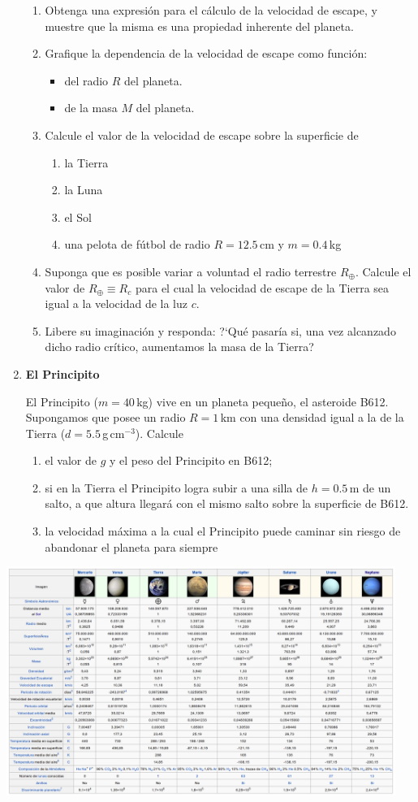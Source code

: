 \documentclass[a4paper,12pt]{article}
\begin{document}
\begin{enumerate}
\begin{enumerate}
\item Obtenga una expresión para el cálculo de la velocidad de escape, y
muestre que la misma es una propiedad inherente del planeta.
\item Grafique la dependencia de la velocidad de escape como función:
\begin{itemize}
\item del radio $R$ del planeta.
\item de la masa $M$ del planeta.
\end{itemize}
\item Calcule el valor de la velocidad de escape sobre la superficie de 
\begin{enumerate}
\item la Tierra
\item la Luna
\item el Sol 
\item una pelota de fútbol de radio $R=12.5$\,cm y $m=0.4$\,kg 
\end{enumerate}
\item Suponga que es posible variar a voluntad el radio terrestre $R_\oplus$.
Calcule el valor de $R_\oplus \equiv R_c$ para el cual la velocidad de escape
de la Tierra sea igual a la velocidad de la luz $c$.
\item Libere su imaginación y responda: ?`Qué pasaría si, una vez alcanzado
dicho radio crítico, aumentamos la masa de la Tierra?
\end{enumerate}

\item {\bf{El Principito}}

El Principito ($m=40$\,kg) vive en un planeta pequeño, el asteroide B612.
Supongamos que posee un radio $R = 1$\,km con una densidad igual a la de la
Tierra ($d = 5.5$\,g\,cm$^{-3}$). Calcule
\begin{enumerate}
\item el valor de $g$ y el peso del Principito en B612;
\item si en la Tierra el Principito logra subir a una silla de $h=0.5$\,m de un
salto, a que altura llegará con el mismo salto sobre la superficie de B612.
\item la velocidad máxima a la cual el Principito puede caminar sin riesgo de
abandonar el planeta para siempre
\end{enumerate}
\end{enumerate}
\centering \includegraphics[angle=90,width=0.95\textwidth]{planetas.png}
\end{document}
